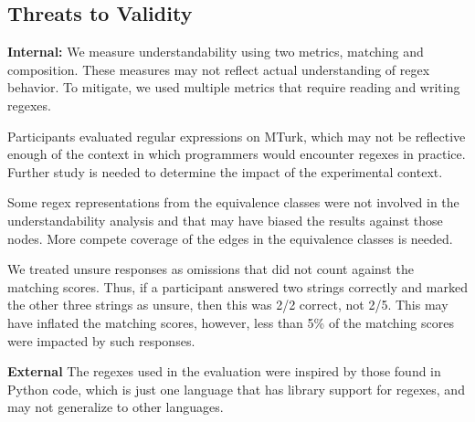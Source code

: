 \subsection{Threats to Validity}

\textbf{Internal:}
We measure understandability  using two metrics, matching and composition. These measures may not reflect actual understanding of regex behavior. To mitigate, we used multiple metrics that require reading and writing regexes. %

Participants evaluated regular expressions  on MTurk, which may not be reflective enough of the context in which programmers would encounter regexes in practice. Further study is needed to determine the impact of the experimental context. 

Some regex representations from the equivalence classes were not involved in the understandability analysis and that may have biased the results against those nodes. 
More compete coverage of the edges in the equivalence classes is needed.

We treated unsure responses as omissions that  did not count  against the matching scores. Thus, if a participant answered two strings correctly and marked the other three strings as unsure, then this was 2/2 correct, not 2/5. This may have inflated the matching scores, however, less than 5\% of the matching scores were impacted by such responses.



%

\textbf{External}
The regexes  used in the evaluation were inspired by those found in Python code, which is just one language that has library support for regexes, and may not generalize to other languages.%

